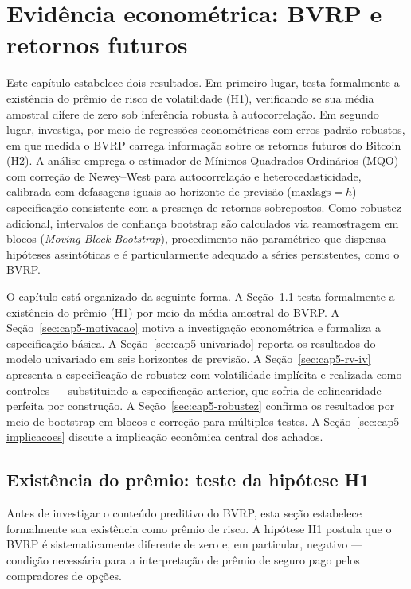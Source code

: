 ﻿\chapter{Evidência econométrica: BVRP e retornos futuros}
\label{chap:resultados_ols}
Este capítulo estabelece dois resultados. Em primeiro lugar, testa
formalmente a existência do prêmio de risco de volatilidade (H1),
verificando se sua média amostral difere de zero sob inferência robusta à
autocorrelação. Em segundo lugar, investiga, por meio de regressões
econométricas com erros-padrão robustos, em que medida o BVRP carrega
informação sobre os retornos futuros do Bitcoin (H2). A análise emprega o
estimador de Mínimos Quadrados Ordinários
(MQO) com correção de Newey--West para autocorrelação e heterocedasticidade,
calibrada com defasagens iguais ao horizonte de previsão ($\text{maxlags} = h$)
--- especificação consistente com a presença de retornos sobrepostos. Como
robustez adicional, intervalos de confiança bootstrap são calculados via
reamostragem em blocos (\textit{Moving Block Bootstrap}), procedimento não
paramétrico que dispensa hipóteses assintóticas e é particularmente adequado
a séries persistentes, como o BVRP.

O capítulo está organizado da seguinte forma. A Seção~\ref{sec:cap5-h1}
testa formalmente a existência do prêmio (H1) por meio da média amostral do
BVRP. A Seção~\ref{sec:cap5-motivacao}
motiva a investigação econométrica e formaliza a especificação básica. A
Seção~\ref{sec:cap5-univariado} reporta os resultados do modelo univariado em
seis horizontes de previsão. A Seção~\ref{sec:cap5-rv-iv} apresenta a
especificação de robustez com volatilidade implícita e realizada como
controles --- substituindo a especificação anterior, que sofria de
colinearidade perfeita por construção. A Seção~\ref{sec:cap5-robustez}
confirma os resultados por meio de bootstrap em blocos e correção para
múltiplos testes. A Seção~\ref{sec:cap5-implicacoes} discute a implicação
econômica central dos achados.

\section{Existência do prêmio: teste da hipótese H1}
\label{sec:cap5-h1}

Antes de investigar o conteúdo preditivo do BVRP, esta seção estabelece
formalmente sua existência como prêmio de risco. A hipótese H1 postula que
o BVRP é sistematicamente diferente de zero e, em particular, negativo ---
condição necessária para a interpretação de prêmio de seguro pago pelos
compradores de opções.

